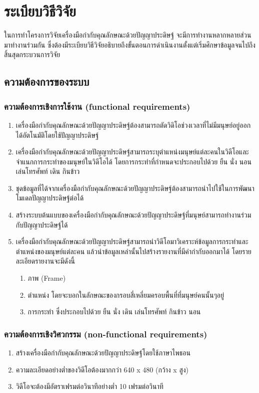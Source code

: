\chapter{ระเบียบวิธีวิจัย}
ในการทําโครงการวิจัยเครื่องมือกำกับคุณลักษณะด้วยปัญญาประดิษฐ์ จะมีการทำงานหลากหลายส่วนมาทำงานร่วมกัน 
ซึ่งต้องมีระเบียบวิธีวิจัยอธิบายถึงขั้นตอนการดำเนินงานตั้งแต่เริ่มศึกษาข้อมูลจนไปถึงสิ้นสุดกระบวนการวิจัย
\section{ความต้องการของระบบ}
\subsection{ความต้องการเชิงการใช้งาน (functional requirements)}
\begin{enumerate}
	\setlength\itemsep{-0.25em}
    \item เครื่องมือกำกับคุณลักษณะด้วยปัญญาประดิษฐ์ต้องสามารถตัดวิดิโอช่วงเวลาที่ไม่มีมนุษย์อยู่ออกได้อัตโนมัติโดยใช้ปัญญาประดิษฐ์ 
	\item เครื่องมือกำกับคุณลักษณะด้วยปัญญาประดิษฐ์สามารถระบุตำแหน่งมนุษย์แต่ละคนในวิดีโอและจำแนกการกระทำของมนุษย์ในวิดีโอได้ 
	โดยการกระทำที่กำหนดจะประกอบไปด้วย ยืน นั่ง นอน เล่นโทรศัพท์ เดิน กินข้าว
	\item ชุดข้อมูลที่ได้จากเครื่องมือกำกับคุณลักษณะด้วยปัญญาประดิษฐ์ต้องสามารถนำไปใช้ในการพัฒนาโมเดลปัญญาประดิษฐ์ต่อได้ 
	\item สร้างระบบต้นแบบของเครื่องมือกำกับคุณลักษณะด้วยปัญญาประดิษฐ์ที่มนุษย์สามารถทำงานร่วมกับปัญญาประดิษฐ์ได้
	\item เครื่องมือกำกับคุณลักษณะด้วยปัญญาประดิษฐ์สามารถนำวิดีโอมาวิเคราะห์ข้อมูลการกระทำและตำแหน่งของมนุษย์แต่ละคน แล้วนำข้อมูลเหล่านั้นไปสร้างรายงานที่มีคำกำกับออกมาได้ โดยรายละเอียดรายงานจะมีดังนี้
	\begin{enumerate}
		\item ภาพ (Frame)
		\item ตำแหน่ง โดยจะบอกในลักษณะของกรอบสี่เหลี่ยมครอบพื้นที่ที่มนุษย์คนนั้นๆอยู่
		\item การกระทำ ซึ่งประกอบไปด้วย ยืน นั่ง เดิน เล่นโทรศัพท์ กินข้าว นอน
	\end{enumerate}
\end{enumerate}
\subsection{ความต้องการเชิงวิศวกรรม (non-functional requirements)}
\begin{enumerate}
	\setlength\itemsep{-0.25em}
	\item สร้างเครื่องมือกำกับคุณลักษณะด้วยปัญญาประดิษฐ์โดยใช้ภาษาไพธอน
	\item ความละเอียดอย่างต่ำของวิดีโอต้องมากกว่า 640 x 480 (กว้าง x สูง) 
	\item วิดีโอจะต้องมีอัตราเฟรมต่อวินาทีอย่างต่ำ 10 เฟรมต่อวินาที
\end{enumerate}
\clearpage

